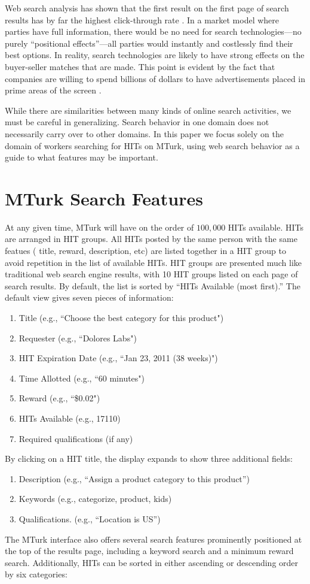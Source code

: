 \documentclass{sig-alternate}
\begin{document}
Web search analysis has shown that the  first result on the first page of search results has by far the highest click-through rate \cite{spink2000selected}.  In a market model where parties have full
information, there would be no need for search technologies---no purely ``positional effects''---all parties would instantly and
costlessly find their best options.  In reality, search technologies
are likely to have strong effects on the buyer-seller matches that are
made.  This point is evident by the fact that companies are willing to
spend billions of dollars to have advertisements placed in prime
areas of the screen \cite{edelman2007internet}.

While there are similarities between many kinds of online search
activities, we must be careful in generalizing.  Search behavior in one
domain does not necessarily carry over to other domains.  In this paper
we focus solely on the domain of workers searching for HITs on MTurk,
using web search behavior as a guide to what features may be
important. 

\section{MTurk Search Features} \label{sec:features}
At any given time, MTurk will have on the order of $100,000$ HITs
available.  HITs are arranged in HIT groups.  All HITs posted by the same person with the same featues ( title, reward, description, etc) are listed together in a HIT group to avoid repetition in the list of available HITs.  HIT groups are presented much like traditional web search engine
results, with 10 HIT groups listed on each page of search results.  By default, the list is sorted by ``HITs Available (most
first).''  The default view gives seven pieces of information:
\begin{enumerate}
\item Title (e.g., ``Choose the best category for this product")
\item Requester (e.g., ``Dolores Labs")
\item HIT Expiration Date (e.g., ``Jan 23, 2011 (38 weeks)")
\item Time Allotted (e.g., ``60 minutes")
\item Reward (e.g., ``\$0.02")
\item HITs Available (e.g., 17110)
\item Required qualifications (if any)
\end{enumerate}
By clicking on a HIT title, the display expands to show three
additional fields:
\begin{enumerate}
\item Description (e.g., ``Assign a product category to this product'')
\item Keywords (e.g., categorize, product, kids)
\item Qualifications. (e.g., ``Location is US'')
\end{enumerate}
The MTurk interface also offers several search features prominently
positioned at the top of the results page, including a keyword
search and a minimum reward search.  Additionally, HITs can be sorted in either ascending or descending order by six categories:
\end{document}
